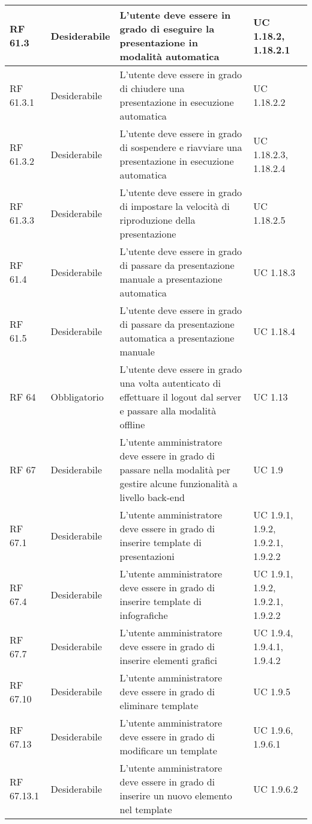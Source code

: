 {\begin{longtable} [c]{| p{2.5cm} | p{2.5cm} | p{6cm} |p{2.5cm}|}
			\hline
			RF 61.3 & Desiderabile & L'utente deve essere in grado di eseguire la presentazione in modalità automatica & UC 1.18.2, 1.18.2.1\\
			\hline
			RF 61.3.1 & Desiderabile & L'utente deve essere in grado di chiudere una presentazione in esecuzione automatica & UC 1.18.2.2\\
			\hline
			RF 61.3.2 & Desiderabile & L'utente deve essere in grado di sospendere e riavviare una presentazione in esecuzione automatica & UC 1.18.2.3, 1.18.2.4\\
			\hline
			RF 61.3.3 & Desiderabile & L'utente deve essere in grado di impostare la velocità di riproduzione della presentazione & UC 1.18.2.5\\
			\hline
			RF 61.4 & Desiderabile & L'utente deve essere in grado di passare da presentazione manuale a presentazione automatica & UC 1.18.3\\
			\hline
			RF 61.5 & Desiderabile & L'utente deve essere in grado di passare da presentazione automatica a presentazione manuale & UC 1.18.4\\
			\hline
			RF 64 & Obbligatorio & L'utente deve essere in grado una volta autenticato di effettuare il logout dal server e passare alla modalità offline & UC 1.13\\
			\hline
			RF 67 & Desiderabile & L'utente amministratore deve essere in grado di passare nella modalità per gestire alcune funzionalità a livello back-end & UC 1.9\\
			\hline
			RF 67.1 & Desiderabile & L'utente amministratore deve essere in grado di inserire template di presentazioni & UC 1.9.1, 1.9.2, 1.9.2.1, 1.9.2.2\\
			\hline
			RF 67.4 & Desiderabile & L'utente amministratore deve essere in grado di inserire template di infografiche & UC 1.9.1, 1.9.2, 1.9.2.1, 1.9.2.2\\
			\hline
			RF 67.7 & Desiderabile & L'utente amministratore deve essere in grado di inserire elementi grafici & UC 1.9.4, 1.9.4.1, 1.9.4.2\\
			\hline
			RF 67.10 & Desiderabile & L'utente amministratore deve essere in grado di eliminare template & UC 1.9.5\\
			\hline
			RF 67.13 & Desiderabile & L'utente amministratore deve essere in grado di modificare un template & UC 1.9.6, 1.9.6.1\\
			\hline
			RF 67.13.1 & Desiderabile & L'utente amministratore deve essere in grado di inserire un nuovo elemento nel template & UC 1.9.6.2\\

\end{longtable}}
